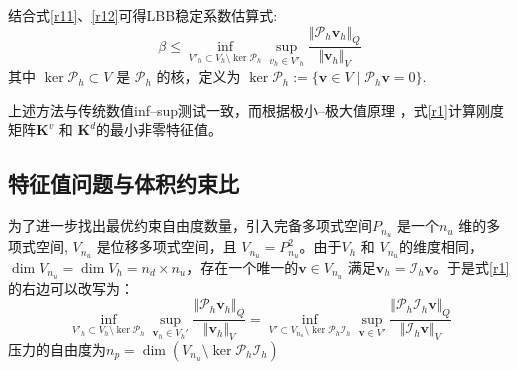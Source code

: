 结合式\eqref{r11}、\eqref{r12}可得LBB稳定系数估算式:
\begin{equation}\label{r1}
    \beta \le \inf_{V'_h \subset V_h \setminus \ker \mathcal P_h} \sup_{v_h \in V'_h} \frac{\Vert \mathcal P_h \boldsymbol v_h \Vert_Q}{\Vert \boldsymbol v_h \Vert_V}
\end{equation}
其中 $\ker \mathcal P_h \subset V$ 是 $\mathcal P_h$ 的核，定义为 $\ker \mathcal P_h := \{ \boldsymbol v \in V \;\vert\; \mathcal P_h \boldsymbol v = 0 \}$.

上述方法与传统数值inf--sup测试一致\cite{malkus1981}，而根据极小--极大值原理 \cite{babuska1991a}，式\eqref{r1}计算刚度矩阵$\boldsymbol K^v$ 和 $\boldsymbol K^d$的最小非零特征值。
\subsection{特征值问题与体积约束比}

为了进一步找出最优约束自由度数量，引入完备多项式空间$P_{n_u}$ 是一个$n_u$ 维的多项式空间, $V_{n_u}$ 是位移多项式空间，且 $V_{n_u} = P_{n_u}^2$。由于$V_h$ 和 $V_{n_u}$的维度相同，$\dim V_{n_u}=\dim V_h = n_d\times n_u$，存在一个唯一的$\boldsymbol v \in V_{n_u}$ 满足$\boldsymbol v_h = \mathcal I_h \boldsymbol v$。于是式\eqref{r1}的右边可以改写为：
\begin{equation}\label{r21}
    \inf_{V'_h \subset V_h\setminus \ker \mathcal P_h}\sup_{\boldsymbol v_h \in V_h'} \frac{\Vert \mathcal P_h \boldsymbol v_h \Vert_Q}{\Vert \boldsymbol v_h \Vert_V} = 
    \inf_{V'\subset V_{n_u}\setminus \ker \mathcal P_h \mathcal I_h}\sup_{\boldsymbol v \in V'} \frac{\Vert \mathcal P_h \mathcal I_h \boldsymbol v \Vert_Q}{\Vert \mathcal I_h \boldsymbol v \Vert_V}
\end{equation}
压力的自由度为$n_p = \dim(V_{n_u}\setminus \ker \mathcal P_h \mathcal I_h)$

